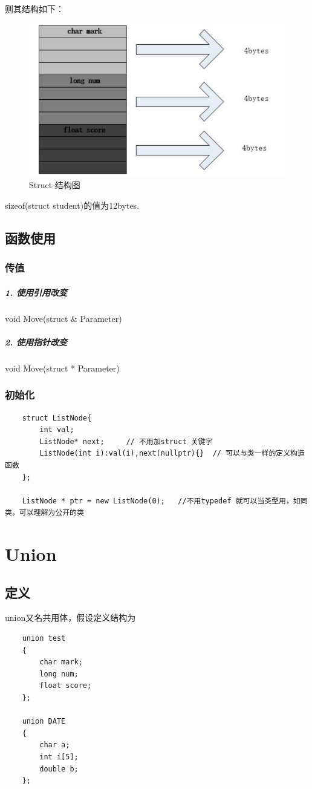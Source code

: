 \documentclass[UTF8,a4paper,12pt]{ctexbook} %
\begin{document}
			则其结构如下：
			\begin{figure}[h]
				\centering
				\includegraphics[width = 12cm]{struct.png}
				\caption{Struct 结构图}
			\end{figure} 
			
			sizeof(struct student)的值为12bytes.
		
		\subsection{函数使用}
			\subsubsection{传值}
		         \subparagraph{1. 使用引用改变}void Move(struct \& Parameter)
		         \subparagraph{2. 使用指针改变}void Move(struct * Parameter)
		         
		    \subsubsection{初始化}
			\begin{lstlisting}
	struct ListNode{
		int val;
		ListNode* next;		// 不用加struct 关键字
		ListNode(int i):val(i),next(nullptr){}	// 可以与类一样的定义构造函数
	};
	
	ListNode * ptr = new ListNode(0);	//不用typedef 就可以当类型用，如同类，可以理解为公开的类			
			\end{lstlisting} 
         
	\section{Union}     
        \subsection{定义} 
	        union又名共用体，假设定义结构为
	        \begin{lstlisting}
	union test
	{
		char mark;
		long num;
		float score;
	};
	
	union DATE
	{
		char a;
		int i[5];
		double b;
	};        
	        \end{lstlisting}
	        
\end{document}
